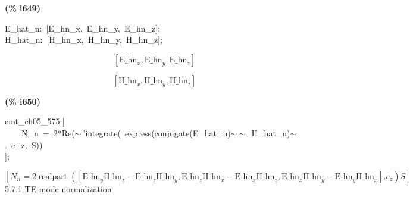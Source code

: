\documentclass[fleqn]{article}
\begin{document}
\noindent
\begin{minipage}[t]{4.000000em}\color{red}\bfseries
(\% i649)	
\end{minipage}
\begin{minipage}[t]{\textwidth}\color{blue}
E\_hat\_n:\ [E\_hn\_x,\ E\_hn\_y,\ E\_hn\_z];\\
H\_hat\_n:\ [H\_hn\_x,\ H\_hn\_y,\ H\_hn\_z];
\end{minipage}
\[\displaystyle \tag{\% o648} 
\left[ {{\ensuremath{\mathrm{E\_ hn}}}_x}\operatorname{,}{{\ensuremath{\mathrm{E\_ hn}}}_y}\operatorname{,}{{\ensuremath{\mathrm{E\_ hn}}}_z}\right] \mbox{}\]

\[\tag{\% o649} 
\left[ {{\ensuremath{\mathrm{H\_ hn}}}_x}\operatorname{,}{{\ensuremath{\mathrm{H\_ hn}}}_y}\operatorname{,}{{\ensuremath{\mathrm{H\_ hn}}}_z}\right] \mbox{}
\]


\noindent
\begin{minipage}[t]{4.000000em}\color{red}\bfseries
(\% i650)	
\end{minipage}
\begin{minipage}[t]{\textwidth}\color{blue}
cmt\_ch05\_575:[\\
\ \ \ \ N\_n\ =\ 2*Re(\ensuremath{\sim\ }'integrate(\ express(conjugate(E\_hat\_n)\ensuremath{\sim\ }\ensuremath{\sim\ }\ H\_hat\_n)\ensuremath{\sim\ }.\ e\_z,\ S))\ \\
];
\end{minipage}
\[\displaystyle \tag{\% o650} 
\operatorname{[}{N_n}=2 \operatorname{realpart}\operatorname{(}\operatorname{[}{{\ensuremath{\mathrm{E\_ hn}}}_y} {{\ensuremath{\mathrm{H\_ hn}}}_z}-{{\ensuremath{\mathrm{E\_ hn}}}_z} {{\ensuremath{\mathrm{H\_ hn}}}_y}\operatorname{,}{{\ensuremath{\mathrm{E\_ hn}}}_z} {{\ensuremath{\mathrm{H\_ hn}}}_x}-{{\ensuremath{\mathrm{E\_ hn}}}_x} {{\ensuremath{\mathrm{H\_ hn}}}_z}\operatorname{,}{{\ensuremath{\mathrm{E\_ hn}}}_x}{{\ensuremath{\mathrm{H\_ hn}}}_y}-{{\ensuremath{\mathrm{E\_ hn}}}_y} {{\ensuremath{\mathrm{H\_ hn}}}_x}\operatorname{]}\ensuremath{\mathrm{ . }}{e_z}\operatorname{)} S\operatorname{]}\mbox{}
\]
5.7.1   TE mode normalization
\end{document}

